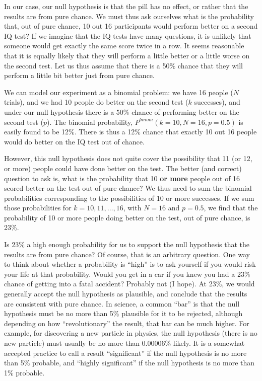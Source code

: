 In our case, our null hypothesis is that the pill has no effect, or rather that the results are from pure chance. We must thus ask ourselves what is the probability that, out of pure chance, 10 out 16 participants would perform better on a second IQ test? If we imagine that the IQ tests have many questions, it is unlikely that someone would get exactly the same score twice in a row. It seems reasonable that it is equally likely that they will perform a little better or a little worse on the second test. Let us thus assume that there is a 50\% chance that they will perform a little bit better just from pure chance.

We can model our experiment as a binomial problem: we have 16 people ($N$ trials), and we had 10 people do better on the second test ($k$ successes), and under our null hypothesis there is a 50\% chance of performing better on the second test ($p$). The binomial probability, $P^{binom}(k=10,N=16,p=0.5)$ is easily found to be 12\%. There is thus a 12\% chance that exactly 10 out 16 people would do better on the IQ test out of chance.

However, this null hypothesis does not quite cover the possibility that 11 (or 12, or more) people could have done better on the test. The better (and correct) question to ask is, what is the probability that 10 \textbf{or more} people out of 16 scored better on the test out of pure chance? We thus need to sum the binomial probabilities corresponding to the possibilities of 10 or more successes. If we sum those probabilities for $k=10, 11, \dots, 16$, with $N=16$ and $p=0.5$, we find that the probability of 10 or more people doing better on the test, out of pure chance, is 23\%.

Is 23\% a high enough probability for us to support the null hypothesis that the results are from pure chance? Of course, that is an arbitrary question. One way to think about whether a probability is ``high'' is to ask yourself if you would risk your life at that probability. Would you get in a car if you knew you had a 23\% chance of getting into a fatal accident? Probably not (I hope). At 23\%, we would generally accept the null hypothesis as plausible, and conclude that the results are consistent with pure chance. In science, a common ``bar'' is that the null hypothesis must be no more than 5\% plausible for it to be rejected, although depending on how ``revolutionary'' the result, that bar can be much higher. For example, for discovering a new particle in physics, the null hypothesis (there is no new particle) must usually be no more than 0.00006\% likely. It is a somewhat accepted practice to call a result ``significant'' if the null hypothesis is no more than 5\% probable, and ``highly significant'' if the null hypothesis is no more than 1\% probable.

